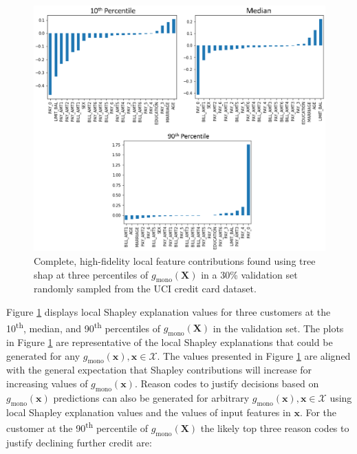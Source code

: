 \documentclass[11pt]{asaproc}
\begin{document}
\begin{figure}[htb]
	\begin{center}
		\includegraphics[scale=0.6]{img/figure_10.eps}
		\caption{Complete, high-fidelity local feature contributions found using tree shap at three percentiles of $g_{\text{mono}}(\mathbf{X})$ in a 30\% validation set randomly sampled from the UCI credit card dataset.}
		\label{fig:cc_shap}
	\end{center}
\end{figure}

Figure \ref{fig:cc_shap} displays local Shapley explanation values for three customers at the 10\textsuperscript{th}, median, and 90\textsuperscript{th} percentiles of $g_{\text{mono}}(\mathbf{X})$ in the validation set. The plots in Figure \ref{fig:cc_shap} are representative of the local Shapley explanations that could be generated for any $g_{\text{mono}}(\mathbf{x}), \mathbf{x} \in \mathcal{X}$. The values presented in Figure \ref{fig:cc_shap} are aligned with the general expectation that Shapley contributions will increase for increasing values of $g_{\text{mono}}(\mathbf{x})$. Reason codes to justify decisions based on $g_{\text{mono}}(\mathbf{x})$ predictions can also be generated for arbitrary $g_{\text{mono}}(\mathbf{x}), \mathbf{x} \in \mathcal{X}$ using local Shapley explanation values and the values of input features in $\mathbf{x}$. For the customer at the 90\textsuperscript{th} percentile of $g_{\text{mono}}(\mathbf{X})$ the likely top three reason codes to justify declining further credit are:
\end{document}
